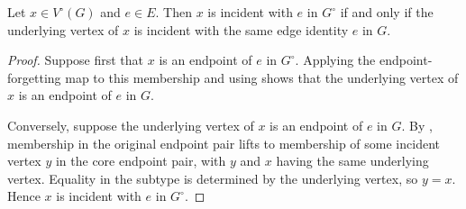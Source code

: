 \begin{lemma}
Let $x\in V^{\circ}(G)$ and $e\in E$.  Then $x$ is incident with $e$ in
$G^{\circ}$ if and only if the underlying vertex of $x$ is incident with
the same edge identity $e$ in $G$.
\end{lemma}
\begin{proof}
Suppose first that $x$ is an endpoint of $e$ in $G^{\circ}$.  Applying the
endpoint-forgetting map to this membership and using
 shows that the underlying vertex of $x$ is
an endpoint of $e$ in $G$.

Conversely, suppose the underlying vertex of $x$ is an endpoint of $e$ in
$G$.  By , membership in the original
endpoint pair lifts to membership of some incident vertex $y$ in the core
endpoint pair, with $y$ and $x$ having the same underlying vertex.  Equality
in the subtype  is determined by the underlying
vertex, so $y=x$.  Hence $x$ is incident with $e$ in $G^{\circ}$.
\end{proof}
